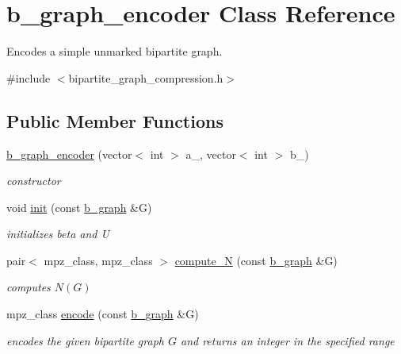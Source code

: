 \hypertarget{classb__graph__encoder}{}\section{b\+\_\+graph\+\_\+encoder Class Reference}
\label{classb__graph__encoder}


Encodes a simple unmarked bipartite graph.  




{\ttfamily \#include $<$bipartite\+\_\+graph\+\_\+compression.\+h$>$}

\subsection*{Public Member Functions}
\begin{DoxyCompactItemize}
\item 
\hyperlink{classb__graph__encoder_a77b8fc4f060a8ef159583f1cfa35f283}{b\+\_\+graph\+\_\+encoder} (vector$<$ int $>$ a\+\_\+, vector$<$ int $>$ b\+\_\+)
\begin{DoxyCompactList}\small\item\em constructor \end{DoxyCompactList}\item 
void \hyperlink{classb__graph__encoder_a9b62ac0580191ac42b98d764046af7cb}{init} (const \hyperlink{classb__graph}{b\+\_\+graph} \&G)
\begin{DoxyCompactList}\small\item\em initializes beta and U \end{DoxyCompactList}\item 
pair$<$ mpz\+\_\+class, mpz\+\_\+class $>$ \hyperlink{classb__graph__encoder_a5a482e6783b10f2d95dd4afc0478eee0}{compute\+\_\+N} (const \hyperlink{classb__graph}{b\+\_\+graph} \&G)
\begin{DoxyCompactList}\small\item\em computes $N(G)$ \end{DoxyCompactList}\item 
mpz\+\_\+class \hyperlink{classb__graph__encoder_a9dbf40f42a2eb12822b14ca10d580763}{encode} (const \hyperlink{classb__graph}{b\+\_\+graph} \&G)
\begin{DoxyCompactList}\small\item\em encodes the given bipartite graph $G$ and returns an integer in the specified range \end{DoxyCompactList}\end{DoxyCompactItemize}

